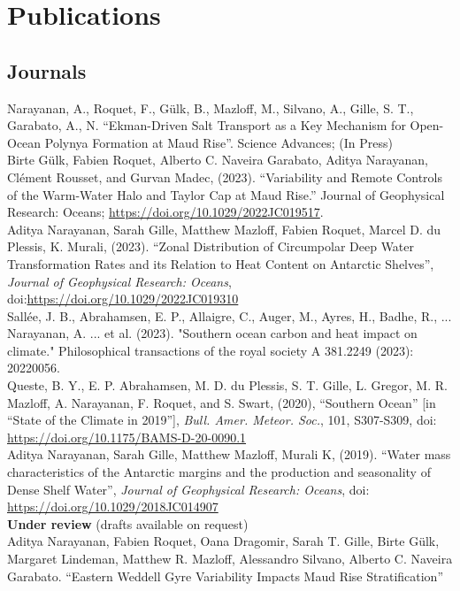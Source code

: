 \documentclass[12pt, a4paper]{article}
\newcommand{\years}[1]{\marginnote{\small #1}}
\begin{document}
\newpage
\section*{Publications}

\subsection*{\bf Journals}
\years{2024} Narayanan, A., Roquet, F., G\"ulk, B., Mazloff, M., Silvano, A., Gille, S. T., Garabato, A., N. ``Ekman-Driven Salt Transport as a Key Mechanism for Open-Ocean Polynya Formation at Maud Rise''. Science Advances; (In Press)\\
\years{2023} Birte Gülk, Fabien Roquet, Alberto C. Naveira Garabato, Aditya Narayanan, Clément Rousset, and Gurvan Madec, (2023). “Variability and Remote Controls of the Warm-Water Halo and Taylor Cap at Maud Rise.” Journal of Geophysical Research: Oceans; \url{https://doi.org/10.1029/2022JC019517}.\\
\years{2023} Aditya Narayanan, Sarah Gille, Matthew Mazloff, Fabien Roquet, Marcel D. du Plessis, K. Murali, (2023). ``Zonal Distribution of Circumpolar Deep Water Transformation Rates and its Relation to Heat Content on Antarctic Shelves'', \emph{Journal of Geophysical Research: Oceans}, doi:\url{https://doi.org/10.1029/2022JC019310}\\
\years{2023} Sallée, J. B., Abrahamsen, E. P., Allaigre, C., Auger, M., Ayres, H., Badhe, R., ... Narayanan, A. ... et al. (2023). "Southern ocean carbon and heat impact on climate." Philosophical transactions of the royal society A 381.2249 (2023): 20220056.\\
\years{2020} Queste, B. Y., E. P. Abrahamsen, M. D. du Plessis, S. T. Gille, L. Gregor, M. R. Mazloff, A. Narayanan, F. Roquet, and S. Swart, (2020), ``Southern Ocean'' [in ``State of the Climate in 2019''], \emph{Bull. Amer. Meteor. Soc.}, 101, S307-S309, doi: \url{https://doi.org/10.1175/BAMS-D-20-0090.1}\\
\years{2019} Aditya Narayanan, Sarah Gille, Matthew Mazloff, Murali K, (2019). ``Water mass characteristics of the Antarctic margins and the production and seasonality of Dense Shelf Water'', \emph{Journal of Geophysical Research: Oceans}, doi: \url{https://doi.org/10.1029/2018JC014907}\\


{\bf Under review} (drafts available on request)\\

\years{2024} Aditya Narayanan, Fabien Roquet, Oana Dragomir, Sarah T. Gille, Birte G\"ulk, Margaret Lindeman, Matthew R. Mazloff, Alessandro Silvano, Alberto C. Naveira Garabato. ``Eastern Weddell Gyre Variability Impacts Maud Rise Stratification''\\
\end{document}
